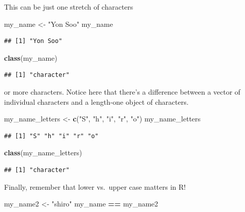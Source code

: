 \documentclass[]{book}
\newenvironment{Shaded}{\begin{snugshade}}{\end{snugshade}}
\newcommand{\KeywordTok}[1]{\textcolor[rgb]{0.13,0.29,0.53}{\textbf{#1}}}
\newcommand{\NormalTok}[1]{#1}
\newcommand{\OperatorTok}[1]{\textcolor[rgb]{0.81,0.36,0.00}{\textbf{#1}}}
\newcommand{\StringTok}[1]{\textcolor[rgb]{0.31,0.60,0.02}{#1}}
\theoremstyle{definition}
\theoremstyle{definition}
\theoremstyle{definition}
\theoremstyle{remark}
\begin{document}
This can be just one stretch of characters

\begin{Shaded}
\begin{Highlighting}[]
\NormalTok{my_name <-}\StringTok{ "Yon Soo"}
\NormalTok{my_name}
\end{Highlighting}
\end{Shaded}

\begin{verbatim}
## [1] "Yon Soo"
\end{verbatim}

\begin{Shaded}
\begin{Highlighting}[]
\KeywordTok{class}\NormalTok{(my_name)}
\end{Highlighting}
\end{Shaded}

\begin{verbatim}
## [1] "character"
\end{verbatim}

or more characters. Notice here that there's a difference between a vector of individual characters and a length-one object of characters.

\begin{Shaded}
\begin{Highlighting}[]
\NormalTok{my_name_letters <-}\StringTok{ }\KeywordTok{c}\NormalTok{(}\StringTok{"S"}\NormalTok{, }\StringTok{"h"}\NormalTok{, }\StringTok{"i"}\NormalTok{, }\StringTok{"r"}\NormalTok{, }\StringTok{"o"}\NormalTok{)}
\NormalTok{my_name_letters}
\end{Highlighting}
\end{Shaded}

\begin{verbatim}
## [1] "S" "h" "i" "r" "o"
\end{verbatim}

\begin{Shaded}
\begin{Highlighting}[]
\KeywordTok{class}\NormalTok{(my_name_letters)}
\end{Highlighting}
\end{Shaded}

\begin{verbatim}
## [1] "character"
\end{verbatim}

Finally, remember that lower vs.~upper case matters in R!

\begin{Shaded}
\begin{Highlighting}[]
\NormalTok{my_name2 <-}\StringTok{ "shiro"}
\NormalTok{my_name }\OperatorTok{==}\StringTok{ }\NormalTok{my_name2}
\end{Highlighting}
\end{Shaded}
\end{document}
